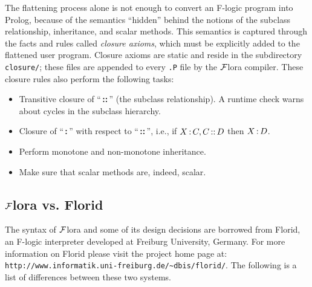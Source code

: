 \documentclass[11pt]{article}
\newcommand{\isa}{\,{\bf{:}}\,}
\newcommand{\subcl}{\,{\bf{::}}\,}
\newcommand{\FLORA}{{\mbox{${\cal F}${\sc lora}}}\xspace}
\newcommand{\FLORID}{{\mbox{\sc Florid}}\xspace}
\newcommand{\fl}{{F-logic}\xspace}
\begin{document}
The flattening process alone is not enough to convert an \fl program
into Prolog, because of the semantics ``hidden'' behind the notions of
the subclass relationship, inheritance, and scalar methods. This semantics
is captured through the facts and rules called \emph{closure axioms}, which
must be explicitly added to the flattened user program.  Closure axioms are
static and reside in the subdirectory \texttt{closure/}; these files are
appended to every {\tt *.P} file by the \FLORA compiler. These closure
rules also perform the following tasks:

\begin{itemize}
\item Transitive closure of ``\subcl'' (the subclass relationship).  A
  runtime check warns about cycles in the subclass hierarchy.
\item Closure of ``\isa'' with respect to ``\subcl'', i.e., if $X\isa C,
  C\subcl D$ then $X\isa D$.
\item Perform monotone and non-monotone inheritance.
\item Make sure that scalar methods are, indeed, scalar.
\end{itemize}


\subsection{\FLORA vs. \FLORID}

The syntax of \FLORA and some of its design decisions are borrowed from
\FLORID, an \fl interpreter developed at Freiburg University, Germany.
For more information on Florid please visit the project home page at:
\verb|http://www.informatik.uni-freiburg.de/~dbis/florid/|. The following
is a list of differences between these two systems.
\end{document}
